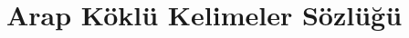 \chapter{Arap Köklü Kelimeler Sözlüğü}
\begin{multicols}{3}
\noindent
\footnotesize

\end{multicols}

